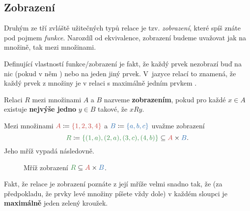 \subsection{Zobrazení}
\label{ssec:zobrazeni}

Druhým ze tří zvláště užitečných typů relace je tzv. \emph{zobrazení}, které
spíš znáte pod pojmem \emph{funkce}. Narozdíl od ekvivalence, zobrazení budeme
uvažovat jak na množině, tak mezi množinami.

Definující vlastností funkce/zobrazení je fakt, že každý prvek nezobrazí buď na
nic (pokud v něm ) nebo na jeden jiný prvek. V~jazyce relací
to znamená, že každý prvek z množiny  je v relaci s maximálně jedním
prvkem .

\begin{definition}[Zobrazení]
 \label{def:zobrazeni}
 Relaci $R$ mezi množinami $A$ a $B$ nazveme \textbf{zobrazením}, pokud pro
 každé $x \in A$ existuje \textbf{nejvýše jedno} $y \in B$ takové, že $xRy$.
\end{definition}

\begin{example}
 Mezi množinami $\clr{A} \coloneqq \clr{\{1,2,3,4\}}$ a $\clb{B} \coloneqq
 \clb{\{a,b,c\}}$ uvažme zobrazení
 \[
  \clg{R} \coloneqq \clg{\{(1, a), (2, a), (3, c), (4, b)\}} \subseteq \clr{A}
  \times \clb{B}.
 \]
 Jeho mříž vypadá následovně.
 \begin{figure}[H]
  \centering
  \caption{Mříž zobrazení $\clg{R} \subseteq \clr{A} \times \clb{B}$.}
  \label{fig:mriz-zobrazeni}
 \end{figure}
 Fakt, že relace je zobrazení poznáte z její mříže velmi snadno tak, že (za
 předpokladu, že prvky levé množiny píšete vždy dole) v každém sloupci je
 \textbf{maximálně} jeden zelený kroužek.
\end{example}

